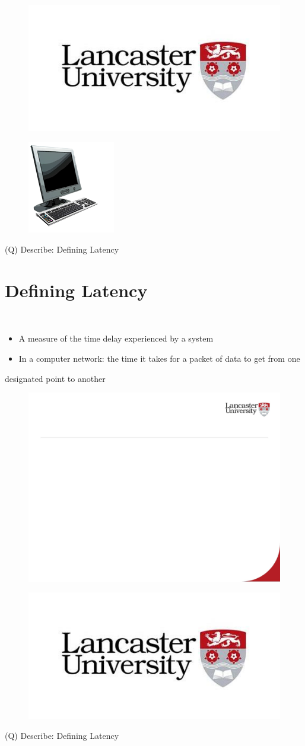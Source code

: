\documentclass[12pt]{article}
\begin{document}
\begin{figure}[H]
\includegraphics[width=0.5\linewidth]{page26-image-2.png}
\end{figure}
\begin{figure}[H]
\includegraphics[width=0.5\linewidth]{page26-image-3.png}
\end{figure}
\clearpage
(Q)
Describe: Defining Latency
\clearpage
\section{Defining Latency}
\\
\begin{itemize}
  \item A measure of the time delay experienced by a system
  \item In a computer network: the time it takes for a packet of data to get from one 
\end{itemize}
designated point to another\\
\begin{figure}[H]
\includegraphics[width=0.5\linewidth]{page27-image-1.png}
\end{figure}
\begin{figure}[H]
\includegraphics[width=0.5\linewidth]{page27-image-2.png}
\end{figure}
\clearpage
(Q)
Describe: Defining Latency
\clearpage
\end{document}
